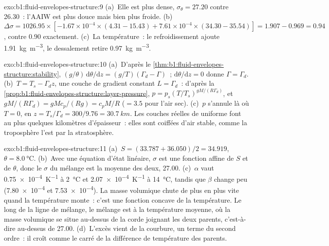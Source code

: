 \begin{solution}{exo:b1:fluid-envelopes-structure:9}
(a)~Elle est plus dense, $\sigma_\theta = 27.20$ contre 26.30~: l'AAIW est plus douce
mais bien plus froide. (b)~$\Delta\sigma = 1026.95 \times [-1.67\times10^{-4} \times
(4.31 - 15.43) + 7.61\times10^{-4} \times (34.30 - 35.54)] = 1.907 - 0.969 =
0.94$, contre $0.90$ exactement. (c)~La température~: le refroidissement ajoute
\qty{1.91}{kg.m^{-3}}, le dessalement retire \qty{0.97}{kg.m^{-3}}.
\end{solution}

\begin{solution}{exo:b1:fluid-envelopes-structure:10}
(a)~D'après le \cref{thm:b1:fluid-envelopes-structure:stability}, $(g/\theta)\,\mathrm
d\theta/\mathrm dz = (g/T)(\Gamma_d - \Gamma)$~; $\mathrm d\theta/\mathrm dz = 0$
donne $\Gamma = \Gamma_d$. (b)~$T = T_s - \Gamma_d z$, une couche de gradient constant
$L = \Gamma_d$~: d'après la \cref{prop:b1:fluid-envelopes-structure:layer-pressure}, $p =
p_s (T/T_s)^{gM/(R\Gamma_d)}$, et $gM/(R\Gamma_d) = gMc_p/(Rg) = c_pM/R$
($= 3.5$ pour l'air sec). (c)~$p$ s'annule là où $T = 0$, en $z = T_s/\Gamma_d =
300/9.76 = \qty{30.7}{km}$. Les couches réelles de  uniforme font
au plus quelques kilomètres d'épaisseur~: elles sont coiffées d'air stable, comme la troposphère l'est
par la stratosphère.
\end{solution}

\begin{solution}{exo:b1:fluid-envelopes-structure:11}
(a)~$S = (33.787 + 36.050)/2 = 34.919$, $\theta = \qty{8.0}{\celsius}$.
(b)~Avec une équation d'état linéaire, $\sigma$ est une fonction affine de $S$ et
de $\theta$, donc le $\sigma$ du mélange est la moyenne des deux, 27.00.
(c)~$\alpha$ vaut \qty{0.75e-4}{K^{-1}} à \qty{2}{\celsius} et
\qty{2.07e-4}{K^{-1}} à \qty{14}{\celsius}, tandis que $\beta$ change peu
(\num{7.80e-4} et \num{7.53e-4}). La masse volumique chute de plus en plus vite quand la
température monte~: c'est une fonction concave de la température. Le long de la ligne
de mélange, le mélange est à la température moyenne, où la masse volumique se situe au-dessus de la
corde joignant les deux parents, c'est-à-dire au-dessus de 27.00. (d)~L'excès vient de la
courbure, un terme du second ordre~: il croît comme le carré de la différence de température
des parents.
\end{solution}

